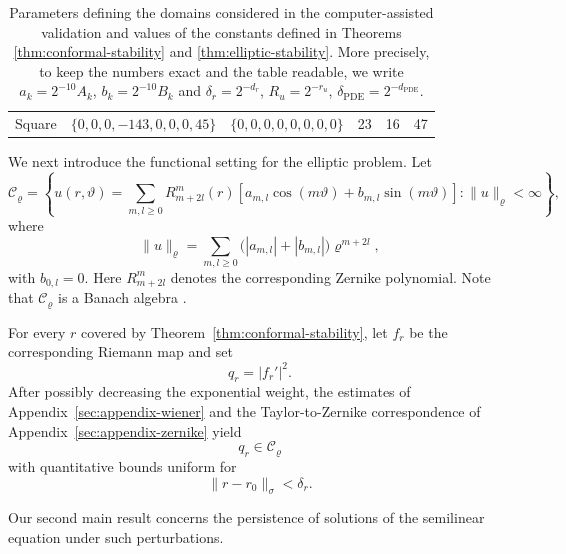 \documentclass[11pt,a4paper]{amsart}
\begin{document}
\begin{table}
\begin{tabular}{lllrcc}
		Square
		& $\{0,0,0,-143,0,0,0,45\}$
		& $\{0,0,0,0,0,0,0,0\}$
		& 23&16&47\\
	\end{tabular}
\bigskip
	
	\caption{Parameters defining the domains considered in the computer-assisted validation and values of the constants defined in Theorems \ref{thm:conformal-stability} and \ref{thm:elliptic-stability}. More precisely, to keep the numbers exact and the table readable, we write $a_k=2^{-10}A_k$, $b_k=2^{-10}B_k$ and $\delta_r=2^{-d_r}$,  $R_u=2^{-r_u}$, $\delta_\mathrm{PDE}=2^{-d_\mathrm{PDE}}$.}
	\label{tab:domains}
\end{table}

We next introduce the functional setting for the elliptic problem.
Let
\[
\mathcal C_\varrho
=
\left\{
u(r,\vartheta)
=
\sum_{m,l\geq0}
R_{m+2l}^{m}(r)
\left[
a_{m,l}\cos(m\vartheta)
+
b_{m,l}\sin(m\vartheta)
\right]:
\|u\|_\varrho<\infty
\right\},
\]
where
\[
\|u\|_\varrho
=
\sum_{m,l\geq0}
\bigl(|a_{m,l}|+|b_{m,l}|\bigr)
\varrho^{m+2l},
\]
with $b_{0,l}=0$. Here $R_{m+2l}^{m}$ denotes the corresponding
Zernike polynomial. Note that $\mathcal C_\varrho$ is a Banach algebra \cite{ArioliKoch1}.

For every $r$ covered by
Theorem~\ref{thm:conformal-stability}, let $f_r$ be the corresponding
Riemann map and set
\[
q_r=|f_r'|^2.
\]
After possibly decreasing the exponential weight, the estimates of
Appendix~\ref{sec:appendix-wiener} and the Taylor-to-Zernike correspondence of Appendix~\ref{sec:appendix-zernike} yield
\[
q_r\in\mathcal C_\varrho
\]
with quantitative bounds uniform for
\[
\|r-r_0\|_\sigma<\delta_r.
\]

Our second main result concerns the persistence of solutions of the
semilinear equation under such perturbations.
\end{document}
